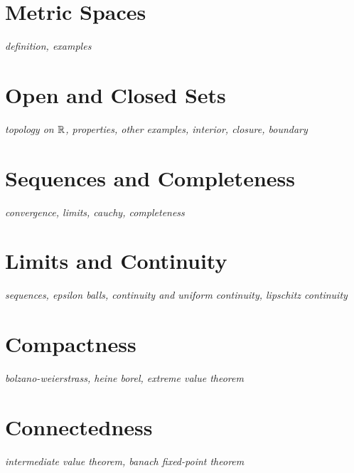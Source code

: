 \documentclass[../../../main.tex]{subfiles}
\begin{document}

\section{Metric Spaces}
\textit{definition, examples}
\section{Open and Closed Sets}
\textit{topology on $\mathbb{R}$, properties, other examples, interior, closure, boundary}
\section{Sequences and Completeness}
\textit{convergence, limits, cauchy, completeness}
\section{Limits and Continuity}
\textit{sequences, epsilon balls, continuity and uniform continuity, lipschitz continuity}
\section{Compactness}
\textit{bolzano-weierstrass, heine borel, extreme value theorem}
\section{Connectedness}
\textit{intermediate value theorem, banach fixed-point theorem}

\printbibliography[
    heading=subbibintoc,
    title={References}
]
\end{document}
